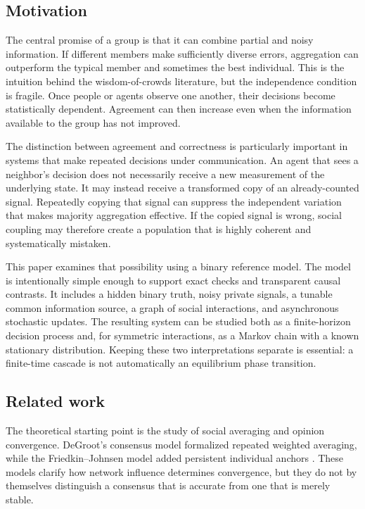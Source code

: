 \documentclass[11pt,a4paper]{article}
\begin{document}
\subsection{Motivation}

The central promise of a group is that it can combine partial and noisy information. If different members make sufficiently diverse errors, aggregation can outperform the typical member and sometimes the best individual. This is the intuition behind the wisdom-of-crowds literature, but the independence condition is fragile. Once people or agents observe one another, their decisions become statistically dependent. Agreement can then increase even when the information available to the group has not improved.

The distinction between agreement and correctness is particularly important in systems that make repeated decisions under communication. An agent that sees a neighbor's decision does not necessarily receive a new measurement of the underlying state. It may instead receive a transformed copy of an already-counted signal. Repeatedly copying that signal can suppress the independent variation that makes majority aggregation effective. If the copied signal is wrong, social coupling may therefore create a population that is highly coherent and systematically mistaken.

This paper examines that possibility using a binary reference model. The model is intentionally simple enough to support exact checks and transparent causal contrasts. It includes a hidden binary truth, noisy private signals, a tunable common information source, a graph of social interactions, and asynchronous stochastic updates. The resulting system can be studied both as a finite-horizon decision process and, for symmetric interactions, as a Markov chain with a known stationary distribution. Keeping these two interpretations separate is essential: a finite-time cascade is not automatically an equilibrium phase transition.

\subsection{Related work}

The theoretical starting point is the study of social averaging and opinion convergence. DeGroot's consensus model formalized repeated weighted averaging, while the Friedkin--Johnsen model added persistent individual anchors \citep{degroot1974,friedkin_johnsen1990}. These models clarify how network influence determines convergence, but they do not by themselves distinguish a consensus that is accurate from one that is merely stable.
\end{document}
